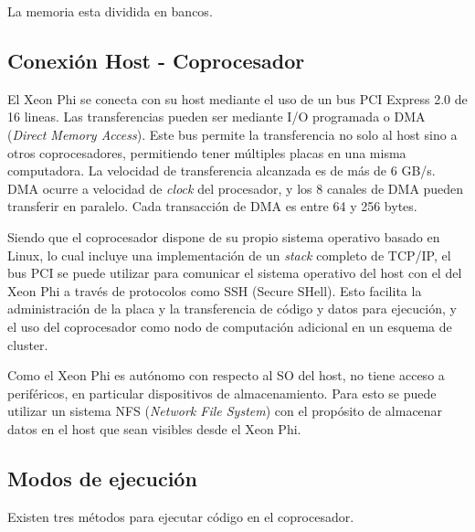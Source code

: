 La memoria esta dividida en bancos.

\subsection{Conexi\'on Host - Coprocesador}

El Xeon Phi se conecta con su host mediante el uso de un bus PCI Express 2.0 de 16 lineas. Las transferencias pueden ser
mediante I/O programada o DMA (\textit{Direct Memory Access}). Este bus permite la transferencia no solo al host sino a
otros coprocesadores, permitiendo tener m\'ultiples placas en una misma computadora. La velocidad de transferencia alcanzada
es de m\'as de 6 GB/s. DMA ocurre a velocidad de \textit{clock} del procesador, y los 8 canales de DMA pueden transferir
en paralelo. Cada transacci\'on de DMA es entre 64 y 256 bytes.

Siendo que el coprocesador dispone de su propio sistema operativo basado en Linux, lo cual incluye una implementaci\'on
de un \textit{stack} completo de TCP/IP, el bus PCI se puede utilizar para comunicar el sistema operativo del host con
el del Xeon Phi a trav\'es de protocolos como SSH (Secure SHell). Esto facilita la administraci\'on de la placa y la
transferencia de c\'odigo y datos para ejecuci\'on, y el uso del coprocesador como nodo de computaci\'on adicional en un
esquema de cluster.

Como el Xeon Phi es aut\'onomo con respecto al SO del host, no tiene acceso a perif\'ericos, en particular dispositivos de almacenamiento.
Para esto se puede utilizar un sistema NFS (\textit{Network File System}) con el prop\'osito de almacenar datos en el host que sean visibles
desde el Xeon Phi.

\subsection{Modos de ejecuci\'on}

Existen tres m\'etodos para ejecutar c\'odigo en el coprocesador.

